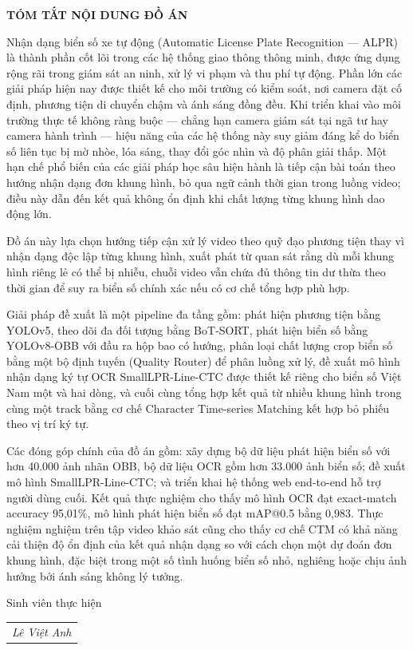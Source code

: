 \documentclass[../DoAn.tex]{subfiles}
\begin{document}
\begin{center}
    \Large{\textbf{TÓM TẮT NỘI DUNG ĐỒ ÁN}}\\
\end{center}
\vspace{1cm}
Nhận dạng biển số xe tự động (Automatic License Plate Recognition — ALPR) là thành phần cốt lõi trong các hệ thống giao thông thông minh, được ứng dụng rộng rãi trong giám sát an ninh, xử lý vi phạm và thu phí tự động. Phần lớn các giải pháp hiện nay được thiết kế cho môi trường có kiểm soát, nơi camera đặt cố định, phương tiện di chuyển chậm và ánh sáng đồng đều. Khi triển khai vào môi trường thực tế không ràng buộc — chẳng hạn camera giám sát tại ngã tư hay camera hành trình — hiệu năng của các hệ thống này suy giảm đáng kể do biển số liên tục bị mờ nhòe, lóa sáng, thay đổi góc nhìn và độ phân giải thấp. Một hạn chế phổ biến của các giải pháp học sâu hiện hành là tiếp cận bài toán theo hướng nhận dạng đơn khung hình, bỏ qua ngữ cảnh thời gian trong luồng video; điều này dẫn đến kết quả không ổn định khi chất lượng từng khung hình dao động lớn.

Đồ án này lựa chọn hướng tiếp cận xử lý video theo quỹ đạo phương tiện thay vì nhận dạng độc lập từng khung hình, xuất phát từ quan sát rằng dù mỗi khung hình riêng lẻ có thể bị nhiễu, chuỗi video vẫn chứa đủ thông tin dư thừa theo thời gian để suy ra biển số chính xác nếu có cơ chế tổng hợp phù hợp.

Giải pháp đề xuất là một pipeline đa tầng gồm: phát hiện phương tiện bằng YOLOv5, theo dõi đa đối tượng bằng BoT-SORT, phát hiện biển số bằng YOLOv8-OBB với đầu ra hộp bao có hướng, phân loại chất lượng crop biển số bằng một bộ định tuyến (Quality Router) để phân luồng xử lý, đề xuất mô hình nhận dạng ký tự OCR SmallLPR-Line-CTC được thiết kế riêng cho biển số Việt Nam một và hai dòng, và cuối cùng tổng hợp kết quả từ nhiều khung hình trong cùng một track bằng cơ chế Character Time-series Matching kết hợp bỏ phiếu theo vị trí ký tự.

Các đóng góp chính của đồ án gồm: xây dựng bộ dữ liệu phát hiện biển số với hơn 40.000 ảnh nhãn OBB, bộ dữ liệu OCR gồm hơn 33.000 ảnh biển số; đề xuất mô hình SmallLPR-Line-CTC; và triển khai hệ thống web end-to-end hỗ trợ người dùng cuối. Kết quả thực nghiệm cho thấy mô hình OCR đạt exact-match accuracy 95,01\%, mô hình phát hiện biển số đạt mAP@0.5 bằng 0,983. Thực nghiệm nghiệm trên tập video khảo sát cũng cho thấy cơ chế CTM có khả năng cải thiện độ ổn định của kết quả nhận dạng so với cách chọn một dự đoán đơn khung hình, đặc biệt trong một số tình huống biển số nhỏ, nghiêng hoặc chịu ảnh hưởng bởi ánh sáng không lý tưởng.

\begin{flushright}
Sinh viên thực hiện\\
\begin{tabular}{@{}c@{}}
\textit{Lê Việt Anh}
\end{tabular}
\end{flushright}
\end{document}
